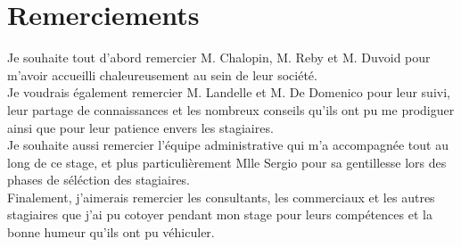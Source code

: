 \chapter*{Remerciements}

Je souhaite tout d'abord remercier M. Chalopin, M. Reby et M. Duvoid pour m'avoir accueilli chaleureusement au sein de leur société.\\

Je voudrais également remercier M. Landelle et M. De Domenico pour leur suivi, leur partage de connaissances et les nombreux conseils qu'ils ont pu me prodiguer ainsi que pour leur patience envers les stagiaires.\\

Je souhaite aussi remercier l'équipe administrative qui m'a accompagnée tout au long de ce stage, et plus particulièrement Mlle Sergio pour sa gentillesse lors des phases de séléction des stagiaires.\\

Finalement, j'aimerais remercier les consultants, les commerciaux et les autres stagiaires que j'ai pu cotoyer pendant mon stage pour leurs compétences et la bonne humeur qu'ils ont pu véhiculer.